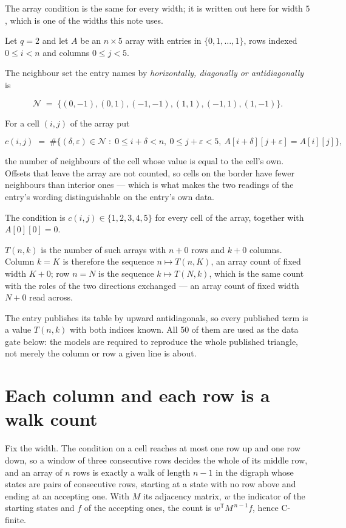 \documentclass[11pt]{article}
\theoremstyle{definition}
\begin{document}
The array condition is the same for every width; it is written out here for width $5$, which is one of the widths this note uses.

Let $q = 2$ and let $A$ be an $n \times 5$ array with entries in $\{0,1,\dots,1\}$, rows indexed $0 \le i < n$ and columns $0 \le j < 5$.

The neighbour set the entry names by {\itshape horizontally, diagonally or antidiagonally} is

\[\mathcal{N} \;=\; \{(0,-1), (0,1), (-1,-1), (1,1), (-1,1), (1,-1)\}.\]

For a cell $(i,j)$ of the array put

\[c(i,j) \;=\; \#\bigl\{(\delta,\varepsilon)\in\mathcal{N} \;:\; 0\le i+\delta<n,\ 0\le j+\varepsilon<5,\ A[i+\delta][j+\varepsilon] = A[i][j]\bigr\},\]

the number of neighbours of the cell whose value is equal to the cell's own. Offsets that leave the array are not counted, so cells on the border have fewer neighbours than interior ones --- which is what makes the two readings of the entry's wording distinguishable on the entry's own data.

The condition is $c(i,j) \in \{1, 2, 3, 4, 5\}$ for every cell of the array, together with $A[0][0]=0$.

$T(n,k)$ is the number of such arrays with $n + 0$ rows and $k + 0$ columns. Column $k = K$ is therefore the sequence $n \mapsto T(n,K)$, an array count of fixed width $K + 0$; row $n = N$ is the sequence $k \mapsto T(N,k)$, which is the same count with the roles of the two directions exchanged --- an array count of fixed width $N + 0$ read across.

The entry publishes its table by upward antidiagonals, so every published term is a value $T(n,k)$ with both indices known. All 50 of them are used as the data gate below: the models are required to reproduce the whole published triangle, not merely the column or row a given line is about.

\section{Each column and each row is a walk count}

Fix the width. The condition on a cell reaches at most one row up and one row down, so a window of three consecutive rows decides the whole of its middle row, and an array of $n$ rows is exactly a walk of length $n-1$ in the digraph whose states are pairs of consecutive rows, starting at a state with no row above and ending at an accepting one. With $M$ its adjacency matrix, $w$ the indicator of the starting states and $f$ of the accepting ones, the count is $w^{\mathsf T}M^{\,n-1}f$, hence C-finite.
\end{document}
